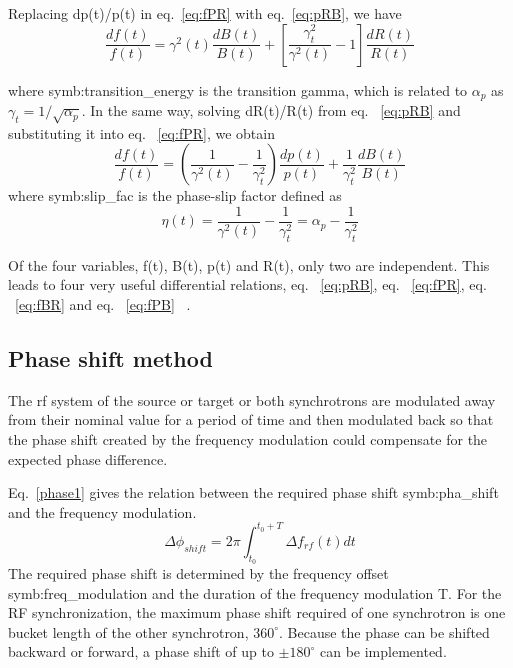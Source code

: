 Replacing dp(t)/p(t) in eq.~\ref{eq:fPR} with eq.~\ref{eq:pRB}, we have
\begin{equation}
\label{eq:fBR}
\frac{df(t)}{f(t)} ={\gamma^2(t)}\frac{dB(t)}{B(t)}+[\frac{\gamma_t^2}{\gamma^2(t)}-1]\frac{dR(t)}{R(t)} 
\end{equation}

where \gls{symb:transition_energy} is the transition gamma, which is related to $\alpha_p$ as $\gamma_t=1/\sqrt{\alpha_p}$. In the same way, solving dR(t)/R(t) from eq. ~\ref{eq:pRB} and substituting it into eq. ~\ref{eq:fPR}, we obtain
\begin{equation}
\label{eq:fPB}
\frac{df(t)}{f(t)} =(\frac{1}{\gamma^2(t)}-\frac{1}{\gamma_t^2}) \frac{dp(t)}{p(t)}+\frac{1}{\gamma_t^2}\frac{dB(t)}{B(t)} 
\end{equation}
where \gls{symb:slip_fac} is the phase-slip factor defined as
\begin{equation}
\label{eq:phse_slip}
\eta(t) =\frac{1}{\gamma^2(t)}-\frac{1}{\gamma_t^2}=\alpha_p-\frac{1}{\gamma_t^2}
\end{equation}


Of the four variables, f(t), B(t), p(t) and R(t), only two are independent. This leads to four very useful differential relations, eq. ~\ref{eq:pRB}, eq. ~\ref{eq:fPR}, eq. ~\ref{eq:fBR} and eq. ~\ref{eq:fPB} ~\cite{ezura_beam-dynamics_2008, bovet_selection_1970}. 

\subsection{Phase shift method}

The rf system of the source or target or both synchrotrons are modulated away from their nominal value for a period of time and then modulated back so that the phase shift created by the frequency modulation could compensate for the expected phase difference. 

Eq.~\ref{phase1} gives the relation between the required phase shift \gls{symb:pha_shift} and the frequency modulation. 
\begin{equation}
\Delta \phi_{shift}= 2\pi \int_{t_0}^{t_0+T} \Delta f_{rf}(t)dt \label{phase1}
\end{equation}
The required phase shift is determined by the frequency offset \gls{symb:freq_modulation} and the duration of the frequency modulation T. For the RF synchronization, the maximum phase shift required of one synchrotron is one bucket length of the other synchrotron, $360^\circ$. Because the phase can be shifted backward or forward, a phase shift of up to $\pm 180^\circ$ can be implemented. 

